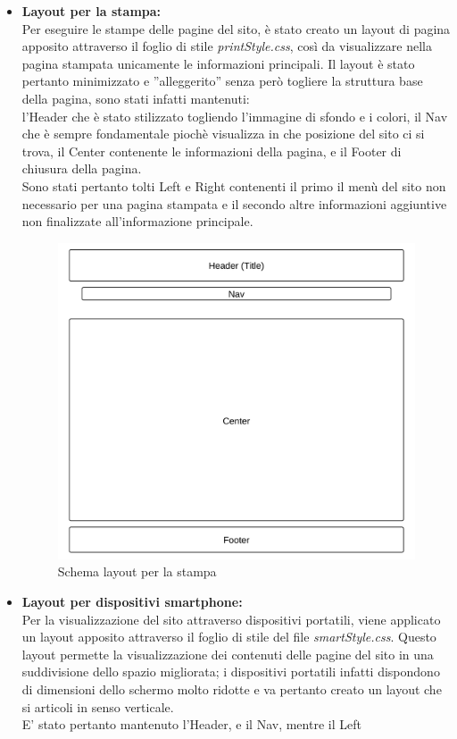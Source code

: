 \begin{itemize}
\item \textbf{Layout per la stampa:}\\
Per eseguire le stampe delle pagine del sito, è stato creato un layout di pagina apposito attraverso il foglio di stile \textit{printStyle.css}, così da visualizzare nella pagina stampata unicamente le informazioni principali. Il layout è stato pertanto minimizzato e ''alleggerito'' senza però togliere la struttura base della pagina, sono stati infatti mantenuti:\\
l'Header che è stato stilizzato togliendo l'immagine di sfondo e i colori, il Nav che è sempre fondamentale piochè visualizza in che posizione del sito ci si trova, il Center contenente le informazioni della pagina, e il Footer di chiusura della pagina.\\
Sono stati pertanto tolti Left e Right contenenti il primo il menù del sito non necessario per una pagina stampata e il secondo altre informazioni aggiuntive non finalizzate all'informazione principale.


 

\begin{center}
\begin{figure}[H]
\centering
\includegraphics[scale=0.55]{images/printLayout.png}
\caption{Schema layout per la stampa}
\end{figure}
\end{center}



\item \textbf{Layout per dispositivi smartphone:}\\
Per la visualizzazione del sito attraverso dispositivi portatili, viene applicato un layout apposito attraverso il foglio di stile del file \textit{smartStyle.css}. Questo layout permette la visualizzazione dei contenuti delle pagine del sito in una suddivisione dello spazio migliorata; i dispositivi portatili infatti dispondono di dimensioni dello schermo molto ridotte e va pertanto creato un layout che si articoli in senso verticale.\\
E' stato pertanto mantenuto l'Header, e il Nav, mentre il Left



\end{itemize}
